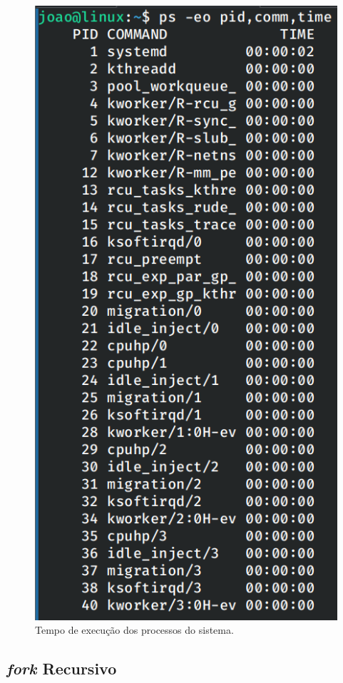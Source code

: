 \documentclass[
	12pt,				%
	oneside,   	        %
	a4paper,			%
	english,			%
	french,				%
	spanish,			%
	brazil,				%
	]{pacotes/abntex2}
\begin{document}
\begin{figure}[H]
  \centering
  \includegraphics[scale=0.45]{figuras/time.png}
  \caption{Tempo de execução dos processos do sistema.}
  \label{fig:time}
\end{figure}

\subsection{\textit{fork} Recursivo}
\label{subsec:fork}
\end{document}
